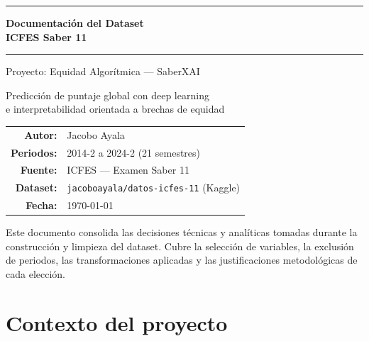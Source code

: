 \documentclass[12pt, a4paper]{article}
\begin{document}
\begin{titlepage}
  \centering
  \vspace*{3cm}
  {\color{primary}\rule{\linewidth}{1.5pt}}\vspace{0.6cm}

  {\Huge\bfseries\color{primary} Documentación del Dataset\\[0.3em]
  ICFES Saber 11}\vspace{0.5cm}

  {\color{primary}\rule{\linewidth}{1.5pt}}\vspace{1.2cm}

  {\large\color{secondary} Proyecto: Equidad Algorítmica — SaberXAI}\vspace{0.4cm}

  {\normalsize Predicción de puntaje global con deep learning\\
  e interpretabilidad orientada a brechas de equidad}\vspace{2cm}

  \begin{tabular}{rl}
    \textbf{Autor:}    & Jacobo Ayala \\[4pt]
    \textbf{Periodos:} & 2014-2 a 2024-2 (21 semestres) \\[4pt]
    \textbf{Fuente:}   & ICFES — Examen Saber 11 \\[4pt]
    \textbf{Dataset:}  & \texttt{jacoboayala/datos-icfes-11} (Kaggle) \\[4pt]
    \textbf{Fecha:}    & \today \\
  \end{tabular}

  \vfill
  {\small\color{gray}
  Este documento consolida las decisiones técnicas y analíticas tomadas
  durante la construcción y limpieza del dataset. Cubre la selección de
  variables, la exclusión de periodos, las transformaciones aplicadas y las
  justificaciones metodológicas de cada elección.}
\end{titlepage}

\tableofcontents
\newpage

\section{Contexto del proyecto}
\end{document}
